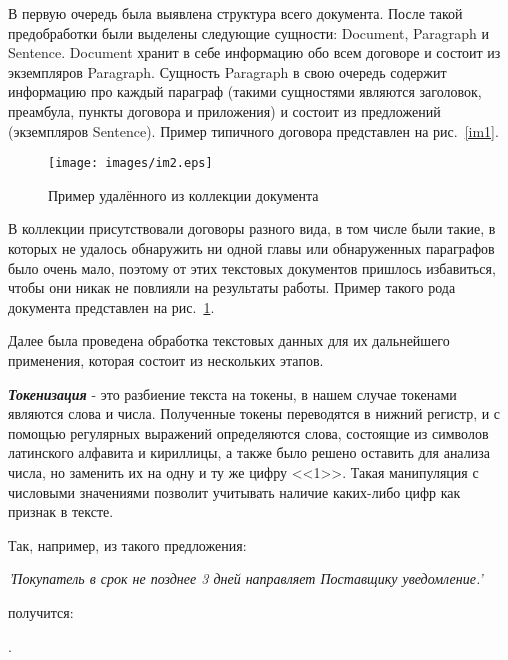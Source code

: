 \documentclass[12pt]{article}
\begin{document}
В первую очередь была выявлена структура всего документа. После такой предобработки были выделены следующие сущности: Document, Paragraph и Sentence. Document хранит в себе информацию обо всем договоре и состоит из экземпляров Paragraph. Сущность Paragraph в свою очередь содержит информацию про каждый параграф (такими сущностями являются заголовок, преамбула, пункты договора и приложения) и состоит из предложений (экземпляров Sentence). Пример типичного договора представлен на рис.~\ref{im1}. 

\vspace{5pt}
\begin{figure}[h!]
	\texttt{[image: images/im2.eps]}
	\caption{Пример удалённого из коллекции документа}
	\label{im2}
\end{figure}
\vspace{5pt}

В коллекции присутствовали договоры разного вида, в том числе были такие, в которых не удалось обнаружить ни одной главы или обнаруженных параграфов было очень мало, поэтому от этих текстовых документов пришлось избавиться, чтобы они никак не повлияли на результаты работы. Пример такого рода документа представлен на рис.~\ref{im2}.

Далее была проведена обработка текстовых данных для их дальнейшего применения, которая состоит из нескольких этапов.

\vspace{5pt}
\textbf{\textit{Токенизация}} - это разбиение текста на токены, в нашем случае токенами являются слова и числа. Полученные токены переводятся в нижний регистр, и с помощью регулярных выражений определяются  слова, состоящие из символов латинского алфавита и кириллицы,  а также было решено оставить для анализа числа, но заменить их на одну и ту же цифру <<1>>. Такая манипуляция с числовыми значениями позволит учитывать наличие каких-либо цифр как признак в тексте. 

\vspace{20pt}
Так, например, из такого предложения:

\vspace{13pt}
\noindent\textit{'Покупатель в срок не позднее 3 дней направляет Поставщику уведомление.'}

\vspace{13pt}
\noindent получится:

\vspace{13pt}
.
\end{document}
